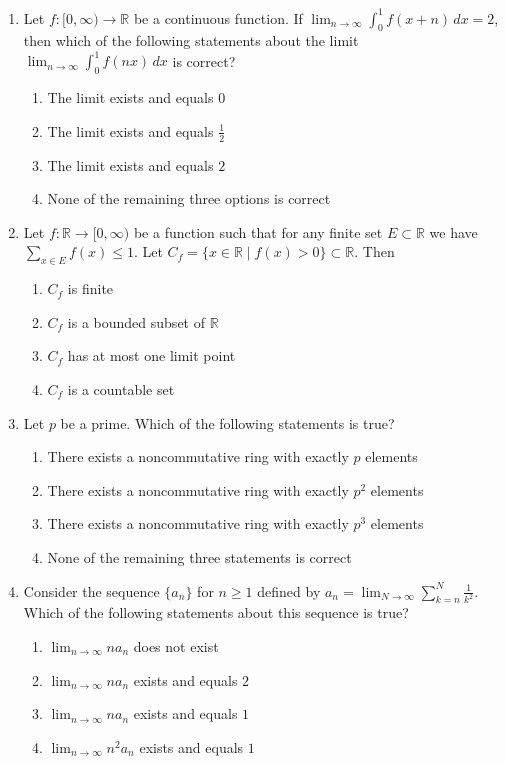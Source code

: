 \documentclass[11pt, a4paper]{article}
\begin{document}
\begin{enumerate}
  \item Let $f: [0,\infty) \to \mathbb{R}$ be a continuous function. If $\lim_{n \to \infty} \int_0^1 f(x + n)\,dx = 2$, then which of the following statements about the limit $\lim_{n \to \infty} \int_0^1 f(nx)\,dx$ is correct?
  \begin{enumerate}[label=(\alph*)]
    \item The limit exists and equals $0$
    \item The limit exists and equals $\frac{1}{2}$
    \item The limit exists and equals $2$
    \item None of the remaining three options is correct
  \end{enumerate}

  \item Let $f: \mathbb{R} \to [0,\infty)$ be a function such that for any finite set $E \subset \mathbb{R}$ we have $\sum_{x \in E} f(x) \le 1$. Let $C_f = \{x \in \mathbb{R} \mid f(x) > 0\} \subset \mathbb{R}$. Then
  \begin{enumerate}[label=(\alph*)]
    \item $C_f$ is finite
    \item $C_f$ is a bounded subset of $\mathbb{R}$
    \item $C_f$ has at most one limit point
    \item $C_f$ is a countable set
  \end{enumerate}

  \item Let $p$ be a prime. Which of the following statements is true?
  \begin{enumerate}[label=(\alph*)]
    \item There exists a noncommutative ring with exactly $p$ elements
    \item There exists a noncommutative ring with exactly $p^2$ elements
    \item There exists a noncommutative ring with exactly $p^3$ elements
    \item None of the remaining three statements is correct
  \end{enumerate}

  \item Consider the sequence $\{a_n\}$ for $n \ge 1$ defined by $a_n = \lim_{N \to \infty} \sum_{k=n}^N \frac{1}{k^2}$. Which of the following statements about this sequence is true?
  \begin{enumerate}[label=(\alph*)]
    \item $\lim_{n \to \infty} n a_n$ does not exist
    \item $\lim_{n \to \infty} n a_n$ exists and equals $2$
    \item $\lim_{n \to \infty} n a_n$ exists and equals $1$
    \item $\lim_{n \to \infty} n^2 a_n$ exists and equals $1$
  \end{enumerate}


\end{enumerate}
\end{document}
